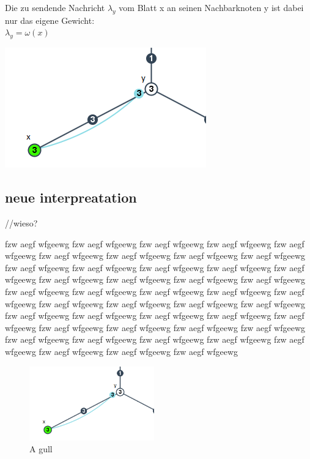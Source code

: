 \begin{enumerate}
\begin{minipage}{0.55\textwidth}
			Die zu sendende Nachricht $\lambda_{y}$ vom Blatt x an seinen Nachbarknoten y ist dabei nur das eigene Gewicht:\\
			$\lambda_{y} = \omega(x)$
		\end{minipage}
		\hfill
		\begin{minipage}{0.35\textwidth}
						
			\includegraphics[width=\textwidth]{bilder/abb_blattknoten.png}
		\end{minipage}
		

\end{enumerate}


\subsection{neue interpreatation}
//wieso?

		fzw aegf wfgeewg fzw aegf wfgeewg fzw aegf wfgeewg fzw aegf wfgeewg fzw aegf wfgeewg fzw aegf wfgeewg fzw aegf wfgeewg fzw aegf wfgeewg fzw aegf wfgeewg fzw aegf wfgeewg fzw aegf wfgeewg fzw aegf wfgeewg fzw aegf wfgeewg fzw aegf wfgeewg fzw aegf wfgeewg fzw aegf wfgeewg fzw aegf wfgeewg fzw aegf wfgeewg fzw aegf wfgeewg fzw aegf wfgeewg fzw aegf wfgeewg fzw aegf wfgeewg fzw aegf wfgeewg fzw aegf wfgeewg fzw aegf wfgeewg fzw aegf wfgeewg fzw aegf wfgeewg fzw aegf wfgeewg fzw aegf wfgeewg fzw aegf wfgeewg fzw aegf wfgeewg fzw aegf wfgeewg fzw aegf wfgeewg fzw aegf wfgeewg fzw aegf wfgeewg fzw aegf wfgeewg fzw aegf wfgeewg fzw aegf wfgeewg fzw aegf wfgeewg fzw aegf wfgeewg fzw aegf wfgeewg fzw aegf wfgeewg fzw aegf wfgeewg fzw aegf wfgeewg 


		\begin{figure}
			\begin{center}
				\includegraphics[width=0.48\textwidth]{bilder/abb_blattknoten.png}
			\end{center}
			\caption{A gull}
		\end{figure}
		
